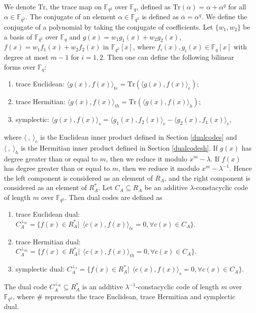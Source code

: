 \documentclass[12 pt]{extarticle}
\numberwithin{equation}{section}
\theoremstyle{definition}
\begin{document}
We denote $\text{Tr}$, the trace map on $\mathbb{F}_{q^2}$ over $\mathbb{F}_q$, defined as $\text{Tr}(\alpha)=\alpha+\alpha^q$ for all $\alpha\in \mathbb{F}_{q^2}$. The conjugate of an element $\alpha\in \mathbb{F}_{q^2}$ is defined as $\overline{\alpha}=\alpha^q$. We define the conjugate of a polynomial by taking the conjugate of coefficients. Let $\{w_1,w_2\}$ be a basis of $\mathbb{F}_{q^2}$ over $\mathbb{F}_q$ and  $g(x)=w_1g_1(x)+w_2g_2(x)$, $f(x)=w_1f_1(x)+w_2f_2(x)$ in $\mathbb{F}_{q^2}[x]$, where $f_i(x),g_i(x)\in \mathbb{F}_q[x]$ with degree at most $m-1$ for $i=1,2$. Then one can define the following bilinear forms over $\mathbb{F}_q$:
 \begin{enumerate}
     \item trace Euclidean: $\langle g(x),f(x)\rangle_{te}= \text{Tr}(\langle g(x),f(x)\rangle_e)$;
     \item trace Hermitian: $\langle g(x),f(x)\rangle_{th}= \text{Tr}(\langle g(x),f(x)\rangle_h)$;
     \item  symplectic: $\langle g(x),f(x)\rangle_{s}= \langle g_1(x),f_2(x)\rangle_e-\langle g_2(x),f_1(x)\rangle_e$,
 \end{enumerate}
where $\langle\ ,\  \rangle_e$ is the Euclidean inner product defined in Section \ref{dualcodes} and $\langle\ ,\  \rangle_h$ is the Hermitian inner product defined in Section \ref{dualcodesh}. 
If $g(x)$ has degree greater than or equal to $m$, then we reduce it modulo $x^m -\lambda$.
If $f(x)$ has degree greater than or equal to $m$, then we reduce it modulo $x^m -\lambda^{-1}$.
Hence the left component is considered as an element of $R_A$, and the right component
is considered as an element of $R_A^*$. Let $C_A\subseteq R_A$ be an additive $\lambda$-constacyclic code of length $m$ over $\mathbb{F}_{q^2}$.  Then dual codes are defined as

 \begin{enumerate}
	\item  trace Euclidean dual: 
	$C_A^{\perp_{te}}=\{f(x)\in R_A^*| \ \ \langle c(x),f(x)\rangle_{te}=0, \forall c(x)\in C_A\}.$
	\item trace Hermitian dual: 
$C_A^{\perp_{th}}=\{f(x)\in R_A^*| \ \ \langle c(x),f(x)\rangle_{th}=0, \forall c(x)\in C_A\}.$
	\item  symplectic dual:
	$C_A^{\perp_{s}}=\{f(x)\in R_A^*| \ \ \langle c(x),f(x)\rangle_{s}=0, \forall c(x)\in C_A\}.$
\end{enumerate} 
The dual code $C^{\perp_\#}_A\subseteq R_A^*$ is an additive $\lambda^{-1}$-constacyclic code of length $m$ over $\mathbb{F}_{q^2}$, where $\#$ represents the trace Euclidean, trace Hermitian and symplectic dual.
\end{document}
